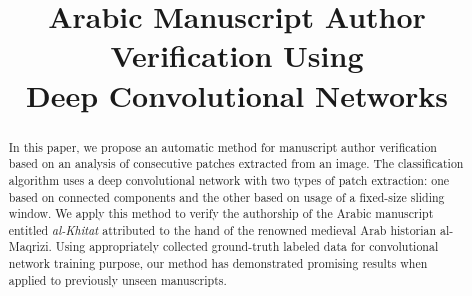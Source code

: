 \documentclass[conference]{IEEEtran}
\begin{document}
\title{Arabic Manuscript Author Verification Using\\ 
Deep Convolutional Networks}

\author{
}

\maketitle

\begin{abstract}
In this paper, we propose an automatic method for manuscript author verification based on an analysis of consecutive patches extracted from an image. The classification algorithm uses a deep convolutional network with two types of patch extraction: one based on connected components and the other based on usage of a fixed-size sliding window. We apply this method to verify the authorship of the Arabic manuscript entitled \textit{al-Khitat} attributed to the hand of the renowned  medieval Arab historian al-Maqrizi. Using appropriately collected ground-truth labeled data for convolutional network training purpose, our method has demonstrated promising results when applied to previously unseen manuscripts.
\end{abstract}

\IEEEpeerreviewmaketitle
\end{document}
